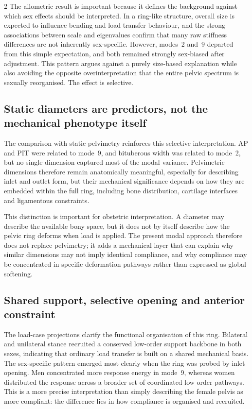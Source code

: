 \documentclass[openacc]{rsproca_new}
\begin{document}
\begin{multicols}{2}
The allometric result is important because it defines the background against which sex effects should be interpreted. In a ring-like structure, overall size is expected to influence bending and load-transfer behaviour, and the strong associations between scale and eigenvalues confirm that many raw stiffness differences are not inherently sex-specific. However, modes~2 and~9 departed from this simple expectation, and both remained strongly sex-biased after adjustment. This pattern argues against a purely size-based explanation while also avoiding the opposite overinterpretation that the entire pelvic spectrum is sexually reorganised. The effect is selective.

\subsection{Static diameters are predictors, not the mechanical phenotype itself}

The comparison with static pelvimetry reinforces this selective interpretation. AP and PIT were related to mode~9, and bituberous width was related to mode~2, but no single dimension captured most of the modal variance. Pelvimetric dimensions therefore remain anatomically meaningful, especially for describing inlet and outlet form, but their mechanical significance depends on how they are embedded within the full ring, including bone distribution, cartilage interfaces and ligamentous constraints.

This distinction is important for obstetric interpretation. A diameter may describe the available bony space, but it does not by itself describe how the pelvic ring deforms when load is applied. The present modal approach therefore does not replace pelvimetry; it adds a mechanical layer that can explain why similar dimensions may not imply identical compliance, and why compliance may be concentrated in specific deformation pathways rather than expressed as global softening.

\subsection{Shared support, selective opening and anterior constraint}

The load-case projections clarify the functional organisation of this ring. Bilateral and unilateral stance recruited a conserved low-order support backbone in both sexes, indicating that ordinary load transfer is built on a shared mechanical basis. The sex-specific pattern emerged most clearly when the ring was probed by inlet opening. Men concentrated more response energy in mode~9, whereas women distributed the response across a broader set of coordinated low-order pathways. This is a more precise interpretation than simply describing the female pelvis as more compliant: the difference lies in how compliance is organised and recruited.


\end{multicols}
\end{document}

